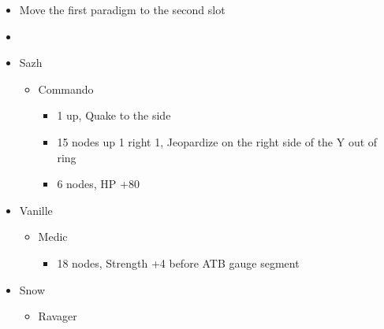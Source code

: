 \begin{paracol}{2}
\begin{menu}
\begin{itemize}
\begin{itemize}
\begin{itemize}
\begin{itemize}
					            \end{itemize}
				      \end{itemize}
			\end{itemize}
		\end{itemize}
	\end{menu}
	\switchcolumn
	\begin{menu}
		\begin{itemize}
			\paradigm
			\begin{itemize}
				\item Move the first paradigm to the second slot
				\item {}%
				      {\paradigmline{(\syn)}{\sab}{\rav}}%
				      {\paradigmline{\com}{\med}{\com}}%
				      {\paradigmline[3]{\textit{\syn}}{\textit{\med}}{\textit{\com}}}%
				      {\paradigmline{\com}{\sab}{\com}}%
				      {\paradigmline{\syn}{\sab}{\com}}%
				      {\paradigmline{\com}{\rav}{\com}}
			\end{itemize}
			\crystarium
			\begin{itemize}
				\item Sazh
				      \begin{itemize}
					      \item Commando
					            \begin{itemize}
						            \item 1 up, Quake to the side
						            \item 15 nodes up 1 right 1, Jeopardize on the right side of the Y out of ring
						            \item 6 nodes, HP +80
					            \end{itemize}
				      \end{itemize}
				\item Vanille
				      \begin{itemize}
					      \item Medic
					            \begin{itemize}
						            \item 18 nodes, Strength +4 before ATB gauge segment
					            \end{itemize}
				      \end{itemize}
				\item Snow
				      \begin{itemize}
					      \item Ravager
					            \begin{itemize}

\end{itemize}
\end{itemize}
\end{itemize}
\end{itemize}
\end{menu}
\end{paracol}
